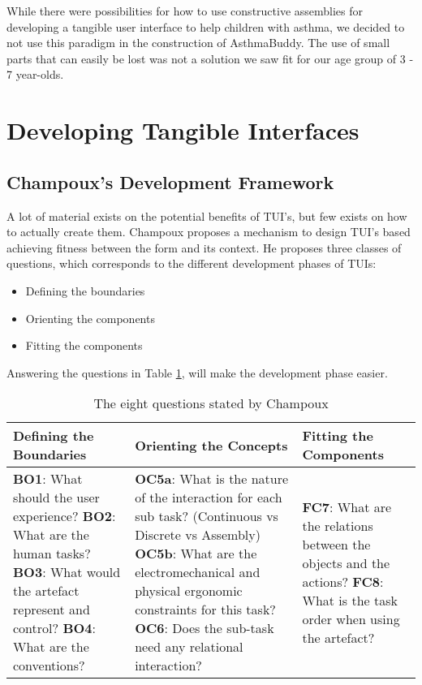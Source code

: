 While there were possibilities for how to use constructive assemblies for developing a tangible user interface to help children with asthma, we decided to not use this paradigm in the construction of AsthmaBuddy. The use of small parts that can easily be lost was not a solution we saw fit for our age group of 3 - 7 year-olds.


\section{Developing Tangible Interfaces}
\label{sec:developingtangibleinterfaces}

\subsection{Champoux's Development Framework}
\label{sec:champoux}
A lot of material exists on the potential benefits of TUI's, but few exists on how to actually create them. Champoux proposes a mechanism to design TUI's based achieving fitness between the form and its context\cite{champoux2007design}.
He proposes three classes of questions, which corresponds to the different development phases of TUIs:
\begin{itemize}
  \item Defining the boundaries
  \item Orienting the components
  \item Fitting the components
\end{itemize} 


Answering the questions in Table \ref{tab:tuidesign}, will make the development phase easier.   


\begin{table}[h]
	\begin{tabular}{| p{5.0cm} | p{5.0cm} | p{5.0cm} |}
	\hline
	\textbf{Defining the Boundaries} & \textbf{Orienting the Concepts} & \textbf{Fitting the Components} \\
	\hline
	\textbf{BO1}: What should the user experience? \newline
	\textbf{BO2}: What are the human tasks? \newline
	\textbf{BO3}: What would the artefact represent and control? \newline 
	\textbf{BO4}: What are the conventions? \newline 
	&
	\textbf{OC5a}: What is the nature of the interaction for each sub task? (Continuous vs Discrete vs Assembly) \newline
	\textbf{OC5b}: What are the electromechanical and physical ergonomic constraints for this task? \newline
	\textbf{OC6}: Does the sub-task need any relational interaction? \newline
	&
	\textbf{FC7}: What are the relations between the objects and the actions? \newline 
	\textbf{FC8}: What is the task order when using the artefact? \\ 
	\hline
	
	\end{tabular}
	\caption{The eight questions stated by Champoux\cite{champoux2007design}}
	\label{tab:tuidesign}
\end{table}  

